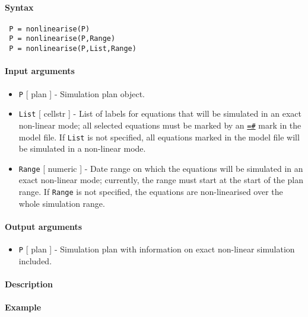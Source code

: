 


	\paragraph{Syntax}
 
 \begin{verbatim}
 P = nonlinearise(P)
 P = nonlinearise(P,Range)
 P = nonlinearise(P,List,Range)
 \end{verbatim}
 
 \paragraph{Input arguments}
 
 \begin{itemize}
 \item
   \texttt{P} {[} plan {]} - Simulation plan object.
 \item
   \texttt{List} {[} cellstr {]} - List of labels for equations that will
   be simulated in an exact non-linear mode; all selected equations must
   be marked by an \href{modellang/exactnonlin}{\texttt{=\#}} mark in the
   model file. If \texttt{List} is not specified, all equations marked in
   the model file will be simulated in a non-linear mode.
 \item
   \texttt{Range} {[} numeric {]} - Date range on which the equations
   will be simulated in an exact non-linear mode; currently, the range
   must start at the start of the plan range. If \texttt{Range} is not
   specified, the equations are non-linearised over the whole simulation
   range.
 \end{itemize}
 
 \paragraph{Output arguments}
 
 \begin{itemize}
 \item
   \texttt{P} {[} plan {]} - Simulation plan with information on exact
   non-linear simulation included.
 \end{itemize}
 
 \paragraph{Description}
 
 \paragraph{Example}


